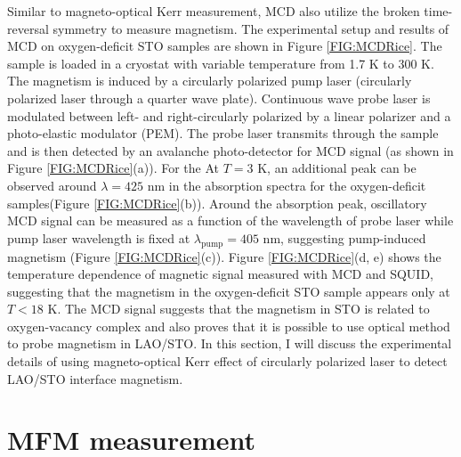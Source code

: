 \documentclass[pdflatex, sectionletters, 12pt]{pittetd}    %
\begin{document}
Similar to magneto-optical Kerr measurement, MCD also utilize the broken time-reversal symmetry to measure magnetism. The experimental setup and results of MCD on oxygen-deficit STO samples are shown in Figure \ref{FIG:MCDRice}. The sample is loaded in a cryostat with variable temperature from 1.7 K to 300 K. The magnetism is induced by a circularly polarized pump laser (circularly polarized laser through a quarter wave plate). Continuous wave probe laser is modulated between left- and right-circularly polarized by a linear polarizer and a photo-elastic modulator (PEM). The probe laser transmits through the sample and is then detected by an avalanche photo-detector for MCD signal (as shown in Figure \ref{FIG:MCDRice}(a)). For the At $T = 3$ K, an additional peak can be observed around $\lambda = 425$ nm in the absorption spectra for the oxygen-deficit samples(Figure \ref{FIG:MCDRice}(b)). Around the absorption peak, oscillatory MCD signal can be measured as a function of the wavelength of probe laser while pump laser wavelength is fixed at $\lambda_{\mathrm{pump}} = 405$ nm, suggesting pump-induced magnetism (Figure \ref{FIG:MCDRice}(c)). Figure \ref{FIG:MCDRice}(d, e) shows the temperature dependence of magnetic signal measured with MCD and SQUID, suggesting that the magnetism in the oxygen-deficit STO sample appears only at $T < 18$ K. The MCD signal suggests that the magnetism in STO is related to oxygen-vacancy complex and also proves that it is possible to use optical method to probe magnetism in LAO/STO. In this section, I will discuss the experimental details of using magneto-optical Kerr effect of circularly polarized laser to detect LAO/STO interface magnetism.

\section{MFM measurement}
\end{document}
